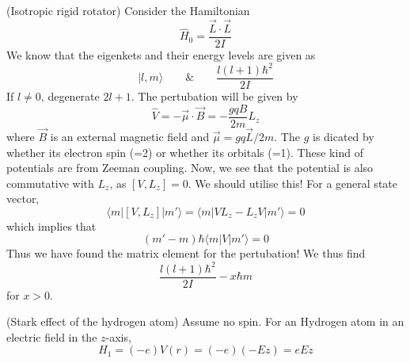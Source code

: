 \vspace{2ex}
\begin{ex}
(Isotropic rigid rotator) Consider the Hamiltonian 
\[\hat{H}_{0}=\dfrac{\vec{L}\cdot \vec{L}}{2I}\]
We know that the eigenkets and their energy levels are given as 
\[|l,m\rangle\qquad \&\qquad \dfrac{l(l+1)\hbar ^2}{2I} \]
If $l\ne 0$, degenerate $2l+1$. The pertubation will be given by
\[\hat{V}=-\vec{\mu }\cdot \vec{B}=-\dfrac{gqB}{2m}L_{z}\]
where $\vec{B}$ is an external magnetic field and $\vec{\mu }=gq\vec{L}/2m$. The $g$ is dicated by whether its electron spin (=2) or whether its orbitals (=1). These kind of potentials are from Zeeman coupling. Now, we see that the potential is also commutative with $L_{z}$, as $[V,L_{z}]=0$. We should utilise this! For a general state vector,
\[\langle m|[V,L_{z}]|m'\rangle =\langle m|VL_{z}-L_{z}V|m'\rangle =0\]
which implies that
\[(m'-m)\hbar \langle m|V|m'\rangle =0\]
Thus we have found the matrix element for the pertubation! We thus find
\[\dfrac{l(l+1)\hbar ^2}{2I}-x\hbar m\]
for $x>0$.
\end{ex}
\vspace{2ex}
\begin{defi}
(Stark effect of the hydrogen atom) Assume no spin. For an Hydrogen atom in an electric field in the $z$-axis, 
\[H_1=(-e)V(r)=(-e)(-Ez)=eEz\]
\end{defi}
\vspace{2ex}

